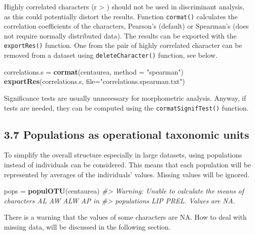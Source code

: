 \documentclass[
]{article}
\newenvironment{Shaded}{\begin{snugshade}}{\end{snugshade}}
\newcommand{\CommentTok}[1]{\textcolor[rgb]{0.56,0.35,0.01}{\textit{#1}}}
\newcommand{\DataTypeTok}[1]{\textcolor[rgb]{0.13,0.29,0.53}{#1}}
\newcommand{\KeywordTok}[1]{\textcolor[rgb]{0.13,0.29,0.53}{\textbf{#1}}}
\newcommand{\NormalTok}[1]{#1}
\newcommand{\StringTok}[1]{\textcolor[rgb]{0.31,0.60,0.02}{#1}}
\begin{document}
Highly correlated characters (r \textgreater{} \textbar)
should not be used in discriminant analysis, as this could potentially
distort the results. Function \texttt{cormat()} calculates the
correlation coefficients of the characters, Pearson's (default) or
Spearman's (does not require normally distributed data). The results can
be exported with the \texttt{exportRes()} function. One from the pair of
highly correlated character can be removed from a dataset using
\texttt{deleteCharacter()} function, see below.

\begin{Shaded}
\begin{Highlighting}[]
\NormalTok{correlations.s =}\StringTok{ }\KeywordTok{cormat}\NormalTok{(centaurea, }\DataTypeTok{method =} \StringTok{"spearman"}\NormalTok{)}
\KeywordTok{exportRes}\NormalTok{(correlations.s, }\DataTypeTok{file=}\StringTok{"correlations.spearman.txt"}\NormalTok{)}
\end{Highlighting}
\end{Shaded}

Significance tests are usually unnecessary for morphometric analysis.
Anyway, if tests are needed, they can be computed using the
\texttt{cormatSignifTest()} function.

\hypertarget{populations-as-operational-taxonomic-units}{%
\subsection{3.7 Populations as operational taxonomic
units}\label{populations-as-operational-taxonomic-units}}

To simplify the overall structure especially in large datasets, using
populations instead of individuals can be considered. This means that
each population will be represented by averages of the individuals'
values. Missing values will be ignored.

\begin{Shaded}
\begin{Highlighting}[]
\NormalTok{pops =}\StringTok{ }\KeywordTok{populOTU}\NormalTok{(centaurea)}
\CommentTok{#> Warning: Unable to calculate the means of characters AL AW ALW AP in}
\CommentTok{#> populations LIP PREL. Values are NA.}
\end{Highlighting}
\end{Shaded}

There is a warning that the values of some characters are NA. How to
deal with missing data, will be discussed in the following section.
\end{document}
